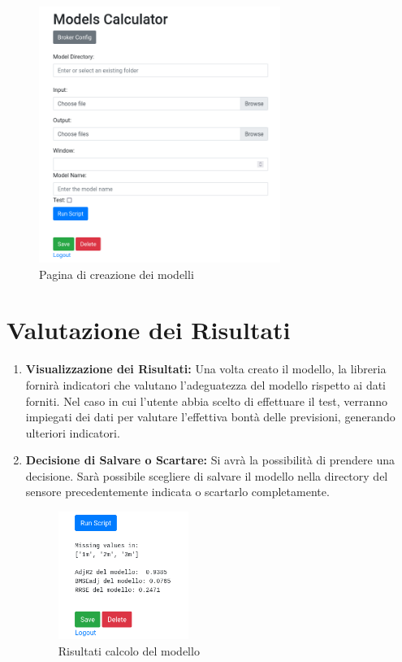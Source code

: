 \documentclass{rapportECL}
\begin{document}
\begin{figure}[htp]
  \centering
  \includegraphics[width=0.7\textwidth]{images/img1.png}
  \caption{Pagina di creazione dei modelli}
\end{figure}
  


\section{Valutazione dei Risultati}
\begin{enumerate}
  \item \textbf{Visualizzazione dei Risultati:} Una volta creato il modello, la libreria fornirà indicatori che valutano l'adeguatezza del modello rispetto ai dati forniti. 
  Nel caso in cui l'utente abbia scelto di effettuare il test, verranno impiegati dei dati per valutare l'effettiva bontà delle previsioni, generando ulteriori indicatori.

  \item \textbf{Decisione di Salvare o Scartare:} Si avrà la possibilità di prendere una decisione. 
  Sarà possibile scegliere di salvare il modello nella directory del sensore precedentemente indicata o scartarlo completamente.

  \begin{figure}[htp]
    \centering
    \includegraphics[width=0.4\textwidth]{images/img6.png}
    \caption{Risultati calcolo del modello}
  \end{figure}

\end{enumerate}
\end{document}

